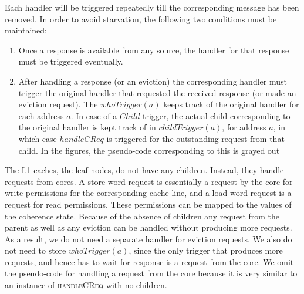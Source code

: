 Each handler will be triggered repeatedly till the corresponding message has
been removed. In order to avoid starvation, the following two conditions must be
maintained:

\begin{enumerate}

\item Once a response is available from any source, the handler for that
response must be triggered eventually.

\item After handling a response (or an eviction) the corresponding handler
must trigger the original handler that requested the received response (or made
an eviction request). The $whoTrigger(a)$ keeps track of the original handler
for each address $a$. In case of a $Child$ trigger, the actual child
corresponding to the original handler is kept track of in $childTrigger(a)$, for
address $a$, in which case $handleCReq$ is triggered for the outstanding request
from that child. In the figures, the pseudo-code corresponding to this is grayed out

\end{enumerate}

The L1 caches, \ie the leaf nodes, do not have any children. Instead, they
handle requests from cores. A store word request is essentially a request by
the core for write permissions for the corresponding cache line, and a load
word request is a request for read permissions. These permissions can be mapped
to the values of the coherence state. Because of the absence of children any
request from the parent as well as any eviction can be handled without
producing more requests. As a result, we do not need a separate handler for
eviction requests. We also do not need to store $whoTrigger(a)$, since the only
trigger that produces more requests, and hence has to wait for response is a
request from the core. We omit the pseudo-code for handling a request from the
core because it is very similar to an instance of \textsc{handleCReq} with no
children.


